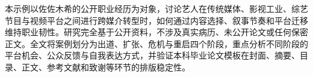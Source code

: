 
本示例以佐佐木希的公开职业经历为对象，讨论艺人在传统媒体、影视工业、综艺节目与视频平台之间进行跨媒介转型时，如何通过内容选择、叙事节奏和平台迁移维持职业韧性。研究完全基于公开资料，不涉及真实病历、未公开论文或任何保密正文。全文将案例划分为出道、扩张、危机与重启四个阶段，重点分析不同阶段的平台机会、公众反馈与自我表达方式，并验证本科毕业论文模板在封面、摘要、目录、正文、参考文献和致谢等环节的排版稳定性。

\jxustKeywordsZhLine
